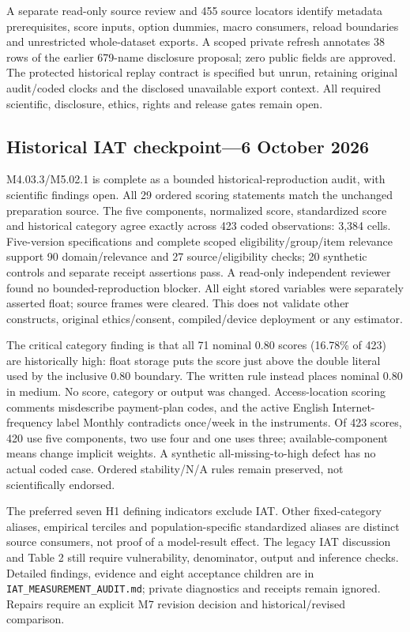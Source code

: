 \documentclass[11pt,a4paper]{article}
\begin{document}
A separate read-only source review and 455 source locators identify metadata prerequisites, score inputs, option dummies, macro consumers, reload boundaries and unrestricted whole-dataset exports. A scoped private refresh annotates 38 rows of the earlier 679-name disclosure proposal; zero public fields are approved. The protected historical replay contract is specified but unrun, retaining original audit/coded clocks and the disclosed unavailable export context. All required scientific, disclosure, ethics, rights and release gates remain open.

\subsection{Historical IAT checkpoint---6 October 2026}
M4.03.3/M5.02.1 is complete as a bounded historical-reproduction audit, with scientific findings open. All 29 ordered scoring statements match the unchanged preparation source. The five components, normalized score, standardized score and historical category agree exactly across 423 coded observations: 3,384 cells. Five-version specifications and complete scoped eligibility/group/item relevance support 90 domain/relevance and 27 source/eligibility checks; 20 synthetic controls and separate receipt assertions pass. A read-only independent reviewer found no bounded-reproduction blocker. All eight stored variables were separately asserted float; source frames were cleared. This does not validate other constructs, original ethics/consent, compiled/device deployment or any estimator.

The critical category finding is that all 71 nominal 0.80 scores (16.78\% of 423) are historically high: float storage puts the score just above the double literal used by the inclusive 0.80 boundary. The written rule instead places nominal 0.80 in medium. No score, category or output was changed. Access-location scoring comments misdescribe payment-plan codes, and the active English Internet-frequency label Monthly contradicts once/week in the instruments. Of 423 scores, 420 use five components, two use four and one uses three; available-component means change implicit weights. A synthetic all-missing-to-high defect has no actual coded case. Ordered stability/N/A rules remain preserved, not scientifically endorsed.

The preferred seven H1 defining indicators exclude IAT. Other fixed-category aliases, empirical terciles and population-specific standardized aliases are distinct source consumers, not proof of a model-result effect. The legacy IAT discussion and Table 2 still require vulnerability, denominator, output and inference checks. Detailed findings, evidence and eight acceptance children are in \texttt{IAT\_MEASUREMENT\_AUDIT.md}; private diagnostics and receipts remain ignored. Repairs require an explicit M7 revision decision and historical/revised comparison.
\end{document}
